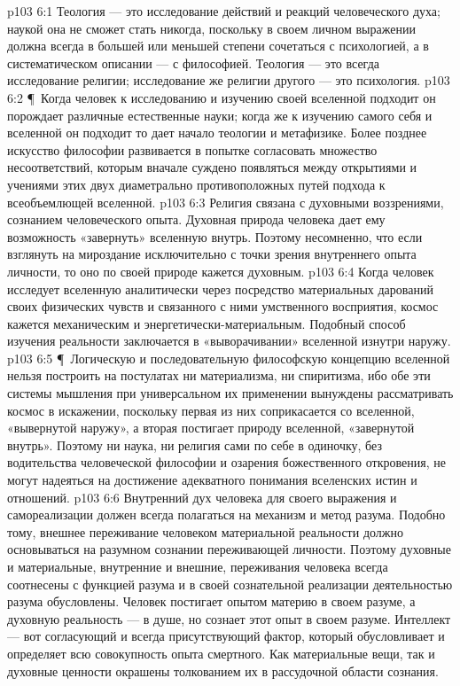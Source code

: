 \vs p103 6:1 Теология --- это исследование действий и реакций человеческого духа; наукой она не сможет стать никогда, поскольку в своем личном выражении должна всегда в большей или меньшей степени сочетаться с психологией, а в систематическом описании --- с философией. Теология --- это всегда исследование  религии; исследование же религии другого --- это психология.
\vs p103 6:2 \P\ Когда человек к исследованию и изучению своей вселенной подходит  он порождает различные естественные науки; когда же к изучению самого себя и вселенной он подходит  то дает начало теологии и метафизике. Более позднее искусство философии развивается в попытке согласовать множество несоответствий, которым вначале суждено появляться между открытиями и учениями этих двух диаметрально противоположных путей подхода к всеобъемлющей вселенной.
\vs p103 6:3 Религия связана с духовными воззрениями, сознанием  человеческого опыта. Духовная природа человека дает ему возможность «завернуть» вселенную внутрь. Поэтому несомненно, что если взглянуть на мироздание исключительно с точки зрения внутреннего опыта личности, то оно по своей природе кажется духовным.
\vs p103 6:4 Когда человек исследует вселенную аналитически через посредство материальных дарований своих физических чувств и связанного с ними умственного восприятия, космос кажется механическим и энергетически\hyp{}материальным. Подобный способ изучения реальности заключается в «выворачивании» вселенной изнутри наружу.
\vs p103 6:5 \P\ Логическую и последовательную философскую концепцию вселенной нельзя построить на постулатах ни материализма, ни спиритизма, ибо обе эти системы мышления при универсальном их применении вынуждены рассматривать космос в искажении, поскольку первая из них соприкасается со вселенной, «вывернутой наружу», а вторая постигает природу вселенной, «завернутой внутрь». Поэтому ни наука, ни религия сами по себе в одиночку, без водительства человеческой философии и озарения божественного откровения, не могут надеяться на достижение адекватного понимания вселенских истин и отношений.
\vs p103 6:6 Внутренний дух человека для своего выражения и самореализации должен всегда полагаться на механизм и метод разума. Подобно тому, внешнее переживание человеком материальной реальности должно основываться на разумном сознании переживающей личности. Поэтому духовные и материальные, внутренние и внешние, переживания человека всегда соотнесены с функцией разума и в своей сознательной реализации деятельностью разума обусловлены. Человек постигает опытом материю в своем разуме, а духовную реальность --- в душе, но сознает этот опыт в своем разуме. Интеллект --- вот согласующий и всегда присутствующий фактор, который обусловливает и определяет всю совокупность опыта смертного. Как материальные вещи, так и духовные ценности окрашены толкованием их в рассудочной области сознания.
